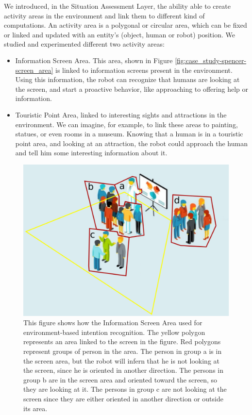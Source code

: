 We introduced, in the Situation Assessment Layer, the ability able to create activity areas in the environment and link them to different kind of computations. An activity area is a polygonal or circular area, which can be fixed or linked and updated with an entity's (object, human or robot) position. We studied and experimented different two activity areas:

\begin{itemize}
\item Information Screen Area. This area, shown in Figure \ref{fig:case_study-spencer-screen_area} is linked to information screens present in the environment. Using this information, the robot can recognize that humans are looking at the screen, and  start a proactive behavior, like approaching to offering help or information.
\item Touristic Point Area, linked to interesting sights and attractions in the environment. We can imagine, for example, to link these areas to painting, statues, or even rooms in a museum. Knowing that a human is in a touristic point area, and looking at an attraction, the robot could approach the human and tell him some interesting information about it.
\end{itemize}

\begin{figure}[ht!]
	\centering
	\includegraphics[scale=0.45]{img/case_study/spencer/environment_intention.pdf}
	\caption{This figure shows how the Information Screen Area used for environment-based intention recognition. The yellow polygon represents an area linked to the screen in the figure. Red polygons represent groups of person in the area. The person in group a is in the screen area, but the robot will infern that he is not looking at the screen, since he is oriented in another direction. The persons in group b are in the screen area and oriented toward the screen, so they are looking at it. The persons in group c are not looking at the screen since they are either oriented in another direction or outside its area.}
	\label{fig:case_study-spencer-architecture}
\end{figure}


